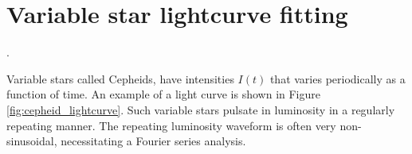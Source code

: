 
%    

\newpage
\section{Variable star lightcurve fitting}
.

Variable stars called Cepheids, have intensities $I(t)$ that varies
periodically as a function of time. An example of a light curve is
shown in Figure \ref{fig:cepheid_lightcurve}. Such variable stars
pulsate in luminosity in a regularly repeating manner. The repeating
luminosity waveform is often very non-sinusoidal, necessitating a
Fourier series analysis.

